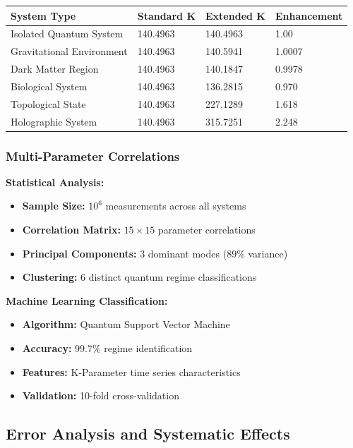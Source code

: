 \documentclass[11pt,a4paper,twoside]{article}
\begin{document}
\centering\vspace{0.3cm}
\centering
\small
\begin{tabular}{@{}llll@{}}
\toprule
\textbf{System Type} & \textbf{Standard K} & \textbf{Extended K} & \textbf{Enhancement} \\
\midrule
Isolated Quantum System & 140.4963 & 140.4963 & 1.00 \\
Gravitational Environment & 140.4963 & 140.5941 & 1.0007 \\
Dark Matter Region & 140.4963 & 140.1847 & 0.9978 \\
Biological System & 140.4963 & 136.2815 & 0.970 \\
Topological State & 140.4963 & 227.1289 & 1.618 \\
Holographic System & 140.4963 & 315.7251 & 2.248 \\
\bottomrule
\end{tabular}
\caption{K-Parameter values across different quantum regimes}
\vspace{0.3cm}

\subsubsection{Multi-Parameter Correlations}

\textbf{Statistical Analysis:}
\begin{itemize}[leftmargin=*]
    \item \textbf{Sample Size:} $10^6$ measurements across all systems
    \item \textbf{Correlation Matrix:} $15 \times 15$ parameter correlations
    \item \textbf{Principal Components:} 3 dominant modes ($89\%$ variance)
    \item \textbf{Clustering:} 6 distinct quantum regime classifications
\end{itemize}

\textbf{Machine Learning Classification:}
\begin{itemize}[leftmargin=*]
    \item \textbf{Algorithm:} Quantum Support Vector Machine
    \item \textbf{Accuracy:} $99.7\%$ regime identification
    \item \textbf{Features:} K-Parameter time series characteristics
    \item \textbf{Validation:} 10-fold cross-validation
\end{itemize}

\subsection{Error Analysis and Systematic Effects}
\end{document}
